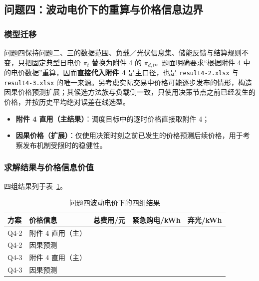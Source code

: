 \subsection{问题四：波动电价下的重算与价格信息边界}

\subsubsection{模型迁移}

问题四保持问题二、三的数据范围、负载／光伏信息集、储能反馈与结算规则不变，只把固定典型日电价 $\pi_t$ 替换为附件 4 的 $\pi_{d,t}$。题面明确要求“根据附件 4 中的电价数据”重算，因而\textbf{直接代入附件 4} 是主口径，也是 \texttt{result4-2.xlsx} 与 \texttt{result4-3.xlsx} 的唯一来源。另考虑实际交易中价格可能逐步发布的情形，构造因果价格预测扩展；其候选方法族与负载侧一致，只使用决策节点之前已经发生的价格，并按历史平均绝对误差在线选型。

\begin{itemize}[itemsep=1pt, topsep=2pt]
	\item \textbf{附件 4 直用（主结果）}：调度目标中的逐时价格直接取附件 4；
	\item \textbf{因果价格（扩展）}：仅使用决策时刻之前已发生的价格预测后续价格，用于考察发布机制受限时的稳健性。
\end{itemize}

\subsubsection{求解结果与价格信息价值}

四组结果列于表~\ref{tab:q4-result}。

\begin{table}[htbp]
	\caption{问题四波动电价下的四组结果}
	\label{tab:q4-result}
	\centering
	\begin{tabular}{l l r r r}
		\toprule
		方案 & 价格信息 & 总费用/元 & 紧急购电/kWh & 弃光/kWh \\
		\midrule
		Q4-2 & 附件 4 直用（主） & \QfourTwoPerfect & \QfourTwoPerfectEm & \QfourTwoPerfectCurtail \\
		Q4-2 & 因果预测 & \QfourTwoCausal & \QfourTwoCausalEm & \QfourTwoCausalCurtail \\
		Q4-3 & 附件 4 直用（主） & \QfourThreePerfect & \QfourThreePerfectEm & \QfourThreePerfectCurtail \\
		Q4-3 & 因果预测 & \QfourThreeCausal & \QfourThreeCausalEm & \QfourThreeCausalCurtail \\
		\bottomrule
	\end{tabular}
\end{table}


